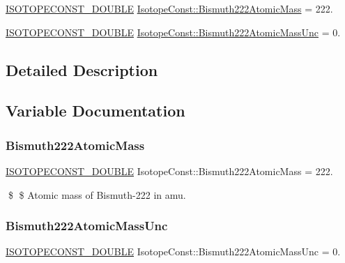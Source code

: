 \begin{DoxyCompactItemize}
\item 
\mbox{\hyperlink{group___isotope_const-_macros_ga8f45a7272ce02c0b4c65c44636ed719a}{I\+S\+O\+T\+O\+P\+E\+C\+O\+N\+S\+T\+\_\+\+D\+O\+U\+B\+LE}} \mbox{\hyperlink{group___isotope_const-_bismuth-_bi222_gaba19134db171de207fda4499546cc96e}{Isotope\+Const\+::\+Bismuth222\+Atomic\+Mass}} = 222.
\item 
\mbox{\hyperlink{group___isotope_const-_macros_ga8f45a7272ce02c0b4c65c44636ed719a}{I\+S\+O\+T\+O\+P\+E\+C\+O\+N\+S\+T\+\_\+\+D\+O\+U\+B\+LE}} \mbox{\hyperlink{group___isotope_const-_bismuth-_bi222_ga46fc61a72bb0ac1a5b4fc31b81bb2cd9}{Isotope\+Const\+::\+Bismuth222\+Atomic\+Mass\+Unc}} = 0.
\end{DoxyCompactItemize}


\subsection{Detailed Description}


\subsection{Variable Documentation}
\mbox{\label{group___isotope_const-_bismuth-_bi222_gaba19134db171de207fda4499546cc96e}} 
\subsubsection{\texorpdfstring{Bismuth222\+Atomic\+Mass}{Bismuth222AtomicMass}}
{\footnotesize\ttfamily \mbox{\hyperlink{group___isotope_const-_macros_ga8f45a7272ce02c0b4c65c44636ed719a}{I\+S\+O\+T\+O\+P\+E\+C\+O\+N\+S\+T\+\_\+\+D\+O\+U\+B\+LE}} Isotope\+Const\+::\+Bismuth222\+Atomic\+Mass = 222.}

\$ \$ Atomic mass of Bismuth-\/222 in amu. \mbox{\label{group___isotope_const-_bismuth-_bi222_ga46fc61a72bb0ac1a5b4fc31b81bb2cd9}} 
\subsubsection{\texorpdfstring{Bismuth222\+Atomic\+Mass\+Unc}{Bismuth222AtomicMassUnc}}
{\footnotesize\ttfamily \mbox{\hyperlink{group___isotope_const-_macros_ga8f45a7272ce02c0b4c65c44636ed719a}{I\+S\+O\+T\+O\+P\+E\+C\+O\+N\+S\+T\+\_\+\+D\+O\+U\+B\+LE}} Isotope\+Const\+::\+Bismuth222\+Atomic\+Mass\+Unc = 0.}

